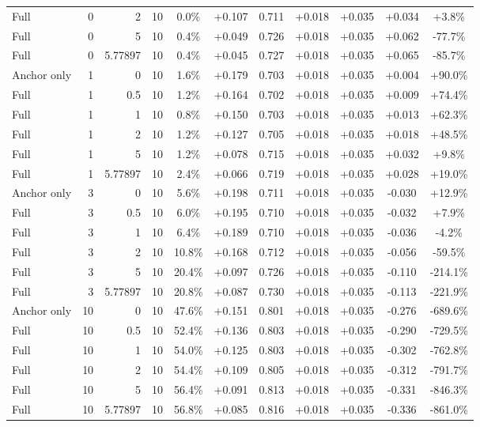 \begin{table}[htbp]
\begin{tabular}{lrrrccccccc}
Full & 0 & 2 & 10 & 0.0\% & +0.107 & 0.711 & +0.018 & +0.035 & +0.034 & +3.8\% \\
Full & 0 & 5 & 10 & 0.4\% & +0.049 & 0.726 & +0.018 & +0.035 & +0.062 & -77.7\% \\
Full & 0 & 5.77897 & 10 & 0.4\% & +0.045 & 0.727 & +0.018 & +0.035 & +0.065 & -85.7\% \\
Anchor only & 1 & 0 & 10 & 1.6\% & +0.179 & 0.703 & +0.018 & +0.035 & +0.004 & +90.0\% \\
Full & 1 & 0.5 & 10 & 1.2\% & +0.164 & 0.702 & +0.018 & +0.035 & +0.009 & +74.4\% \\
Full & 1 & 1 & 10 & 0.8\% & +0.150 & 0.703 & +0.018 & +0.035 & +0.013 & +62.3\% \\
Full & 1 & 2 & 10 & 1.2\% & +0.127 & 0.705 & +0.018 & +0.035 & +0.018 & +48.5\% \\
Full & 1 & 5 & 10 & 1.2\% & +0.078 & 0.715 & +0.018 & +0.035 & +0.032 & +9.8\% \\
Full & 1 & 5.77897 & 10 & 2.4\% & +0.066 & 0.719 & +0.018 & +0.035 & +0.028 & +19.0\% \\
Anchor only & 3 & 0 & 10 & 5.6\% & +0.198 & 0.711 & +0.018 & +0.035 & -0.030 & +12.9\% \\
Full & 3 & 0.5 & 10 & 6.0\% & +0.195 & 0.710 & +0.018 & +0.035 & -0.032 & +7.9\% \\
Full & 3 & 1 & 10 & 6.4\% & +0.189 & 0.710 & +0.018 & +0.035 & -0.036 & -4.2\% \\
Full & 3 & 2 & 10 & 10.8\% & +0.168 & 0.712 & +0.018 & +0.035 & -0.056 & -59.5\% \\
Full & 3 & 5 & 10 & 20.4\% & +0.097 & 0.726 & +0.018 & +0.035 & -0.110 & -214.1\% \\
Full & 3 & 5.77897 & 10 & 20.8\% & +0.087 & 0.730 & +0.018 & +0.035 & -0.113 & -221.9\% \\
Anchor only & 10 & 0 & 10 & 47.6\% & +0.151 & 0.801 & +0.018 & +0.035 & -0.276 & -689.6\% \\
Full & 10 & 0.5 & 10 & 52.4\% & +0.136 & 0.803 & +0.018 & +0.035 & -0.290 & -729.5\% \\
Full & 10 & 1 & 10 & 54.0\% & +0.125 & 0.803 & +0.018 & +0.035 & -0.302 & -762.8\% \\
Full & 10 & 2 & 10 & 54.4\% & +0.109 & 0.805 & +0.018 & +0.035 & -0.312 & -791.7\% \\
Full & 10 & 5 & 10 & 56.4\% & +0.091 & 0.813 & +0.018 & +0.035 & -0.331 & -846.3\% \\
Full & 10 & 5.77897 & 10 & 56.8\% & +0.085 & 0.816 & +0.018 & +0.035 & -0.336 & -861.0\% \\

\end{tabular}
\end{table}
